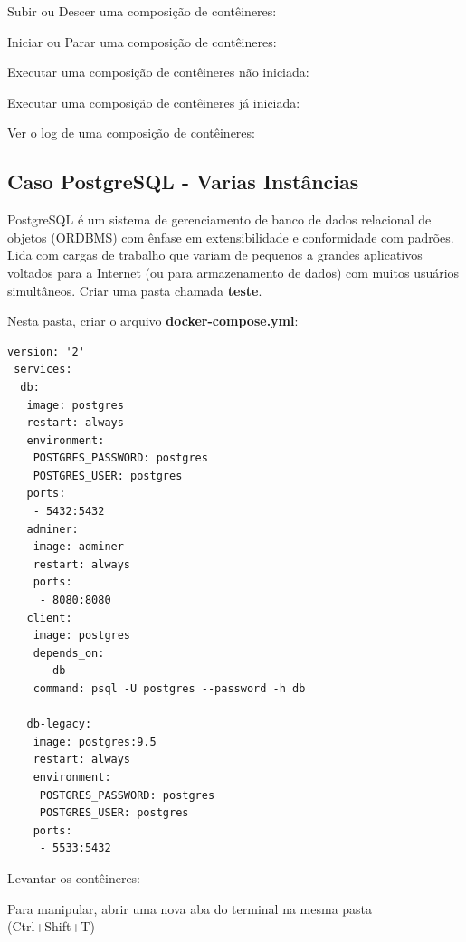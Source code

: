\documentclass[a4paper,11pt]{article}
\begin{document}
Subir ou Descer uma composição de contêineres: \\

Iniciar ou Parar uma composição de contêineres: \\

Executar uma composição de contêineres não iniciada: \\

Executar uma composição de contêineres já iniciada: \\

Ver o log de uma composição de contêineres: \\

\subsection{Caso PostgreSQL - Varias Instâncias}
PostgreSQL é um sistema de gerenciamento de banco de dados relacional de objetos (ORDBMS) com ênfase em extensibilidade e conformidade com padrões. Lida com cargas de trabalho que variam de pequenos a grandes aplicativos voltados para a Internet (ou para armazenamento de dados) com muitos usuários simultâneos. Criar uma pasta chamada \textbf{teste}.

Nesta pasta, criar o arquivo \textbf{docker-compose.yml}:
\begin{lstlisting}[]
version: '2'
 services:
  db:
   image: postgres
   restart: always
   environment:
    POSTGRES_PASSWORD: postgres
    POSTGRES_USER: postgres
   ports:
    - 5432:5432
   adminer:
    image: adminer
    restart: always
    ports:
     - 8080:8080
   client:
    image: postgres
    depends_on:
     - db
    command: psql -U postgres --password -h db
    
   db-legacy:
    image: postgres:9.5
    restart: always
    environment:
     POSTGRES_PASSWORD: postgres
     POSTGRES_USER: postgres
    ports:
     - 5533:5432
\end{lstlisting}
Levantar os contêineres: \\

Para manipular, abrir uma nova aba do terminal na mesma pasta (Ctrl+Shift+T) \\
\end{document}
